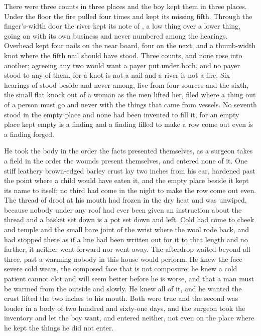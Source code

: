 There were three counts in three places and the boy kept them in three places. Under the floor the fire pulled four times and kept its missing fifth. Through the finger's-width door the river kept its note of , a low thing over a lower thing, going on with its own business and never numbered among the hearings. Overhead  kept four nails on the near board, four on the next, and a thumb-width knot where the fifth nail should have stood. Three counts, and none rose into another; agreeing any two would want a payer put under both, and no payer stood to any of them, for a knot is not a nail and a river is not a fire. Six hearings of  stood beside and never among, five from four sources and the sixth, the small flat knock out of a woman as the men lifted her, filed where a thing out of a person must go and never with the things that came from vessels. No seventh stood in the empty place and none had been invented to fill it, for an empty place kept empty is a finding and a finding filled to make a row come out even is a finding forged.

He took the body in the order the facts presented themselves, as a surgeon takes a field in the order the wounds present themselves, and entered none of it. One stiff leathery brown-edged barley crust lay two inches from his ear, hardened past the point where a child would have eaten it, and the empty place beside it kept its name to itself; no third had come in the night to make the row come out even. The thread of drool at his mouth had frozen in the dry heat and was unwiped, because nobody under any roof had ever been given an instruction about the thread and a basket set down is a pot set down and left. Cold had come to cheek and temple and the small bare joint of the wrist where the wool rode back, and had stopped there as if a line had been written out for it to that length and no farther; it neither went forward nor went away. The afterdrop waited beyond all three, past a warming nobody in this house would perform. He knew the face severe cold wears, the composed face that is not composure; he knew a cold patient cannot clot and will seem better before he is worse, and that a man must be warmed from the outside and slowly. He knew all of it, and he wanted the crust lifted the two inches to his mouth. Both were true and the second was louder in a body of two hundred and sixty-one days, and the surgeon took the inventory and let the boy want, and entered neither, not even on the place where he kept the things he did not enter.


